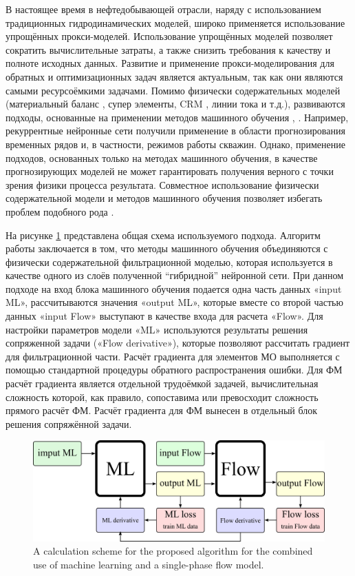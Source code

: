 \documentclass{article}
\begin{document}
В настоящее время в нефтедобывающей отрасли, наряду с использованием традиционных гидродинамических моделей, широко применяется использование упрощённых прокси-моделей. Использование упрощённых моделей позволяет сократить вычислительные затраты, а также снизить требования к качеству и полноте исходных данных. Развитие и применение прокси-моделирования для обратных и оптимизационных задач является актуальным, так как они являются самыми ресурсоёмкими задачами. Помимо физически содержательных моделей (материальный баланс \cite{mus1}, супер элементы, CRM \cite{bek}, линии тока \cite{pot} и т.д.), развиваются подходы, основанные на применении методов машинного обучения \cite{tem}, \cite{uma}. Например, рекуррентные нейронные сети получили применение в области прогнозирования временных рядов и, в частности, режимов работы скважин. Однако, применение подходов, основанных только на методах машинного обучения, в качестве прогнозирующих моделей не может гарантировать получения верного с точки зрения физики процесса результата. Совместное использование физически содержательной модели и методов машинного обучения позволяет избегать проблем подобного рода \cite{kos2}.

На рисунке \ref{fig:schime1} представлена общая схема используемого подхода. Алгоритм работы заключается в том, что методы машинного обучения объединяются с физически содержательной фильтрационной моделью, которая используется в качестве одного из слоёв полученной “гибридной” нейронной сети. При данном подходе на вход блока машинного обучения подается одна часть данных «input ML», рассчитываются значения «output ML», которые вместе со второй частью данных «input Flow» выступают в качестве входа для расчета «Flow». Для настройки параметров модели «ML» используются результаты решения сопряженной задачи («Flow derivative»), которые позволяют рассчитать градиент для фильтрационной части. Расчёт градиента для элементов МО выполняется с помощью стандартной процедуры обратного распространения ошибки. Для ФМ расчёт градиента является отдельной трудоёмкой задачей, вычислительная сложность которой, как правило, сопоставима или превосходит сложность прямого расчёт ФМ. Расчёт градиента для ФМ вынесен в отдельный блок решения сопряжённой задачи.

\begin{figure}
	\centering
	\includegraphics[width=0.7\linewidth]{fig0}
	\caption{A calculation scheme for the proposed algorithm for the combined use of machine learning and a single-phase flow model.}
	\label{fig:schime1}
\end{figure}
\end{document}

